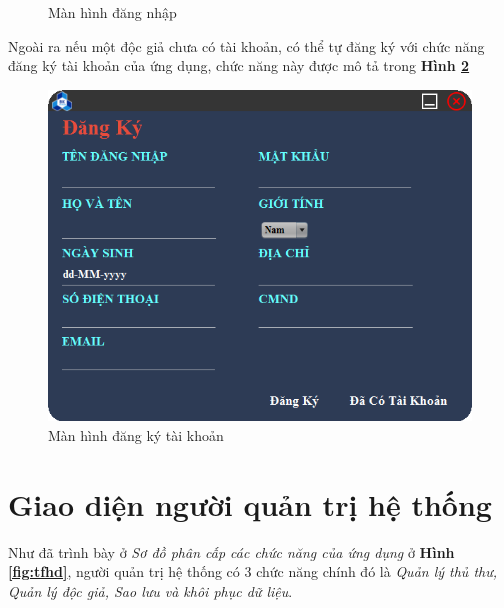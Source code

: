 \documentclass[12pt]{report}
\begin{document}
\begin{itemize}
\begin{figure}
						\caption{Màn hình đăng nhập}
						\label{fig:signin}
						\end{figure}
						Ngoài ra nếu một độc giả chưa có tài khoản, có thể tự đăng ký với chức năng đăng ký tài khoản của ứng dụng, chức năng này được mô tả trong \textbf{Hình \ref{fig:signup}}
						\begin{figure}
						\centering
						\includegraphics[scale=0.75]{images/signup.png}
						\caption{Màn hình đăng ký tài khoản}
						\label{fig:signup}
						\end{figure}
					\end{itemize}
				\section{Giao diện người quản trị hệ thống} 
				Như đã trình bày ở \textit{Sơ đồ phân cấp các chức năng của ứng dụng} ở \textbf{Hình \ref{fig:tfhd}}, người quản trị hệ thống có 3 chức năng chính đó là \textit{Quản lý thủ thư, Quản lý độc giả, Sao lưu và khôi phục dữ liệu}.\\
				
\end{document}
